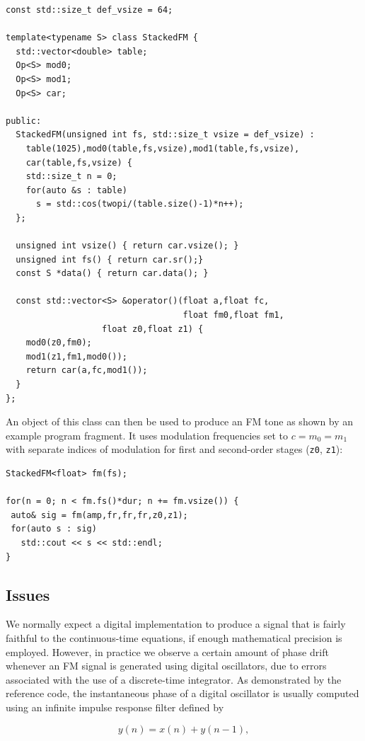 \documentclass[]{interact}
\begin{document}
\begin{lstlisting}
const std::size_t def_vsize = 64;

template<typename S> class StackedFM {
  std::vector<double> table;
  Op<S> mod0; 
  Op<S> mod1;
  Op<S> car;
  
public:
  StackedFM(unsigned int fs, std::size_t vsize = def_vsize) :
    table(1025),mod0(table,fs,vsize),mod1(table,fs,vsize),
    car(table,fs,vsize) {
    std::size_t n = 0;
    for(auto &s : table)
      s = std::cos(twopi/(table.size()-1)*n++);
  };

  unsigned int vsize() { return car.vsize(); }
  unsigned int fs() { return car.sr();}
  const S *data() { return car.data(); }

  const std::vector<S> &operator()(float a,float fc,
                                   float fm0,float fm1,
				   float z0,float z1) {
    mod0(z0,fm0);
    mod1(z1,fm1,mod0());
    return car(a,fc,mod1());
  }
};
\end{lstlisting}

An object of this class can then be used to produce
an FM tone as shown by an example program fragment. 
It uses modulation frequencies set to $c = m_0 = m_1$ with separate
indices of modulation for first and second-order stages (\lstinline{z0}, \lstinline{z1}):

\begin{lstlisting}
StackedFM<float> fm(fs);

for(n = 0; n < fm.fs()*dur; n += fm.vsize()) {
 auto& sig = fm(amp,fr,fr,fr,z0,z1);
 for(auto s : sig)
   std::cout << s << std::endl;
}
\end{lstlisting}


\subsection{Issues}

We normally expect a digital implementation to produce a signal that is fairly faithful to the continuous-time equations, if enough
mathematical precision is employed. However, in practice we observe a certain amount of phase drift whenever 
an FM signal is generated using digital oscillators, due to errors associated with the use of a discrete-time 
integrator. As demonstrated by the reference code, the instantaneous phase of a digital oscillator is usually 
computed using an infinite impulse response filter defined by

\begin{equation}\label{eq:dinteg}
y(n) = x(n) + y(n-1), 
\end{equation}
\smallskip
\end{document}
